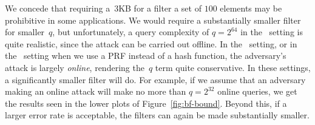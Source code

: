 We concede that requiring a~$3$KB for a filter a set of $100$ elements may be
prohibitive in some applications. We would require a substantially smaller
filter for smaller~$q$, but unfortunately, a query complexity of $q=2^{64}$ in
the \errep\ setting is quite realistic, since the attack can be carried out
offline.
%
In the \erreps\ setting, or in the \errep\ setting when we use a PRF instead of a
hash function, the adversary's attack is largely \emph{online}, rendering
the~$q$ term quite conservative. In these settings, a significantly smaller
filter will do. For example, if we assume that an adversary making an online
attack will make no more than $q=2^{32}$ online queries, we get the results seen
in the lower plots of Figure~\ref{fig:bf-bound}. Beyond this, if a larger error rate is acceptable, the filters can
again be made substantially smaller.

